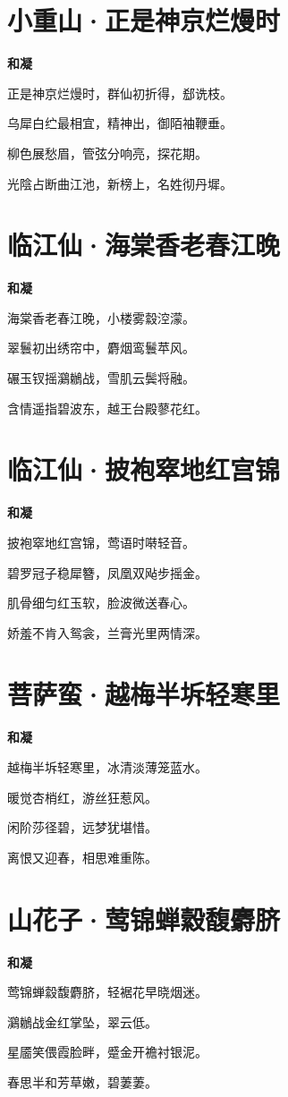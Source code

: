\documentclass[12pt,a4paper]{ctexbook}
\begin{document}
\section{小重山·正是神京烂熳时}
\textbf{和凝}\par\vspace{0.5em}
正是神京烂熳时，群仙初折得，郄诜枝。\par
乌犀白纻最相宜，精神出，御陌袖鞭垂。\par
柳色展愁眉，管弦分响亮，探花期。\par
光陰占断曲江池，新榜上，名姓彻丹墀。\par

\section{临江仙·海棠香老春江晚}
\textbf{和凝}\par\vspace{0.5em}
海棠香老春江晚，小楼雾縠涳濛。\par
翠鬟初出绣帘中，麝烟鸾鬟苹风。\par
碾玉钗摇鸂鶒战，雪肌云鬓将融。\par
含情遥指碧波东，越王台殿蓼花红。\par

\section{临江仙·披袍窣地红宫锦}
\textbf{和凝}\par\vspace{0.5em}
披袍窣地红宫锦，莺语时啭轻音。\par
碧罗冠子稳犀簪，凤凰双飐步摇金。\par
肌骨细匀红玉软，脸波微送春心。\par
娇羞不肯入鸳衾，兰膏光里两情深。\par

\section{菩萨蛮·越梅半坼轻寒里}
\textbf{和凝}\par\vspace{0.5em}
越梅半坼轻寒里，冰清淡薄笼蓝水。\par
暖觉杏梢红，游丝狂惹风。\par
闲阶莎径碧，远梦犹堪惜。\par
离恨又迎春，相思难重陈。\par

\section{山花子·莺锦蝉縠馥麝脐}
\textbf{和凝}\par\vspace{0.5em}
莺锦蝉縠馥麝脐，轻裾花早晓烟迷。\par
鸂鶒战金红掌坠，翠云低。\par
星靥笑偎霞脸畔，蹙金开襜衬银泥。\par
春思半和芳草嫩，碧萋萋。\par
\end{document}

